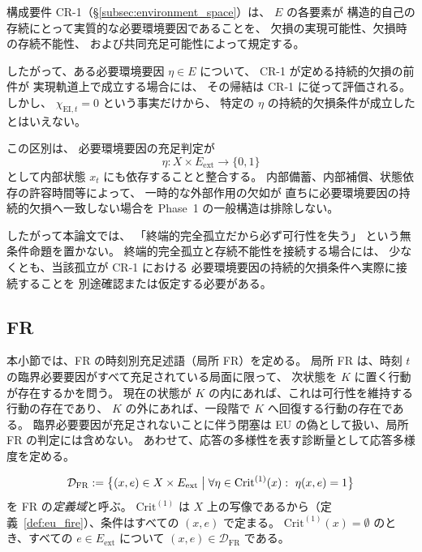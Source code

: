 \begin{remark}[CR-1 と実現外部相互作用の接続範囲]
\label{rem:cr1_ei_connection}
構成要件 CR-1（\S\ref{subsec:environment_space}）は、
$E$ の各要素が
構造的自己の存続にとって実質的な必要環境要因であることを、
欠損の実現可能性、欠損時の存続不能性、
および共同充足可能性によって規定する。

したがって、ある必要環境要因 $\eta\in E$ について、
CR-1 が定める持続的欠損の前件が
実現軌道上で成立する場合には、
その帰結は CR-1 に従って評価される。
しかし、
$\chi_{\mathrm{EI},t}=0$
という事実だけから、
特定の $\eta$ の持続的欠損条件が成立したとはいえない。

この区別は、
必要環境要因の充足判定が
\[
  \eta:X\times E_{\mathrm{ext}}\to\{0,1\}
\]
として内部状態 $x_t$ にも依存することと整合する。
内部備蓄、内部補償、状態依存の許容時間等によって、
一時的な外部作用の欠如が
直ちに必要環境要因の持続的欠損へ一致しない場合を
Phase~1 の一般構造は排除しない。

したがって本論文では、
「終端的完全孤立だから必ず可行性を失う」
という無条件命題を置かない。
終端的完全孤立と存続不能性を接続する場合には、
少なくとも、当該孤立が CR-1 における
必要環境要因の持続的欠損条件へ実際に接続することを
別途確認または仮定する必要がある。
\end{remark}

\subsection{FR}
\label{subsec:fr}

本小節では、FR の時刻別充足述語（局所 FR）を定める。
局所 FR は、時刻 $t$ の臨界必要要因がすべて充足されている局面に限って、
次状態を $K$ に置く行動が存在するかを問う。
現在の状態が $K$ の内にあれば、これは可行性を維持する行動の存在であり、
$K$ の外にあれば、一段階で $K$ へ回復する行動の存在である。
臨界必要要因が充足されないことに伴う閉塞は EU の偽として扱い、局所 FR の判定には含めない。
あわせて、応答の多様性を表す診断量として応答多様度を定める。

\begin{definition}[FR の定義域]
\label{def:fr_domain}
\[
  \mathcal{D}_{\mathrm{FR}}
  :=
  \bigl\{
    (x,e)\in X\times E_{\mathrm{ext}}
    \bigm|
    \forall\eta\in\mathrm{Crit}^{(1)}(x):\ \eta(x,e)=1
  \bigr\}
\]
を FR の\emph{定義域}と呼ぶ。
$\mathrm{Crit}^{(1)}$ は $X$ 上の写像であるから（定義~\ref{def:eu_fire}）、条件はすべての $(x,e)$ で定まる。
$\mathrm{Crit}^{(1)}(x)=\emptyset$ のとき、すべての $e\in E_{\mathrm{ext}}$ について $(x,e)\in\mathcal{D}_{\mathrm{FR}}$ である。
\end{definition}

